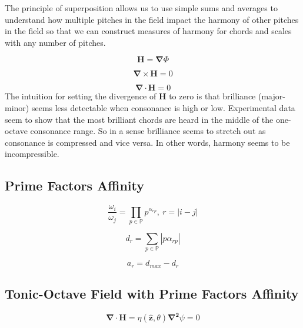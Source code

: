 \documentclass[sn-mathphys]{sn-jnl}%
\begin{document}
The principle of superposition allows us to use simple sums and averages to understand how multiple pitches in the field impact the harmony of other pitches in the field so that we can construct measures of harmony for chords and scales with any number of pitches.

\begin{equation}
  \boldsymbol{H} = \boldsymbol{\nabla}\Phi\label{gradPhiEq}
\end{equation}

\begin{equation}
  \boldsymbol{\nabla \times H}=0\label{harmonyCurlStaticsEq}
\end{equation}

\begin{equation}
  \boldsymbol{\nabla \cdot H}=0\label{harmonyFieldStaticsEq}
\end{equation}
The intuition for setting the divergence of $\mathbf{H}$ to zero is that brilliance (major-minor) seems less detectable when consonance is high or low. Experimental data seem to show that the most brilliant chords are heard in the middle of the one-octave consonance range. So in a sense brilliance seems to stretch out as consonance is compressed and vice versa. In other words, harmony seems to be incompressible.

\subsection{Prime Factors Affinity}

\begin{equation}
  \frac{\omega_{i}}{\omega_{j}} = \prod_{p \in \mathbb{P}} p^{\alpha_{rp}}, \ r=|i-j|
\end{equation}

\begin{equation}
  d_r = \sum_{p \in \mathbb{P}} \left| p \alpha_{rp} \right|
\end{equation}

\begin{equation}
  a_r = d_{max} - d_r
\end{equation}

\subsection{Tonic-Octave Field  with Prime Factors Affinity}

\begin{equation}
  \boldsymbol{\nabla \cdot H}=\eta(\boldsymbol{\hat{z}},\theta)\boldsymbol{\nabla^2}\psi = 0  \label{laplaceEq}
\end{equation}
\end{document}
